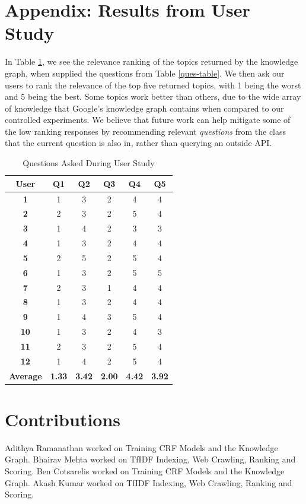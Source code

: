 \documentclass[11pt,a4paper]{article}
\begin{document}



\appendix

\section{Appendix: Results from User Study}

In Table \ref{user-table}, we see the relevance ranking of the topics returned by the knowledge graph, when supplied the questions from Table \ref{ques-table}. We then ask our users to rank the relevance of the top five returned topics, with 1 being the worst and 5 being the best. Some topics work better than others, due to the wide array of knowledge that Google's knowledge graph contains when compared to our controlled experiments. We believe that future work can help mitigate some of the low ranking responses by recommending relevant \textit{questions} from the class that the current question is also in, rather than querying an outside API.

\begin{table}[h!]
\begin{tabular}{|c|c|c|c|c|c|}
    \hline \bf User & \bf Q1 & \bf Q2 & \bf Q3 & \bf Q4 & \bf Q5 \\  
    \hline
    \bf 1 & 1 & 3 & 2 & 4 & 4 \\ 
    \bf 2 & 2 & 3 & 2 & 5 & 4 \\ 
    \bf 3 & 1 & 4 & 2 & 3 & 3 \\ 
    \bf 4 & 1 & 3 & 2 & 4 & 4 \\ 
    \bf 5 & 2 & 5 & 2 & 5 & 4 \\ 
    \bf 6 & 1 & 3 & 2 & 5 & 5 \\ 
    \bf 7 & 2 & 3 & 1 & 4 & 4 \\ 
    \bf 8 & 1 & 3 & 2 & 4 & 4 \\ 
    \bf 9 & 1 & 4 & 3 & 5 & 4 \\ 
    \bf 10 & 1 & 3 & 2 & 4 & 3 \\ 
    \bf 11 & 2 & 3 & 2 & 5 & 4 \\ 
    \bf 12 & 1 & 4 & 2 & 5 & 4 \\ 
    \hline
    \bf Average & \bf 1.33 & \bf 3.42 & \bf 2.00 & \bf 4.42 & \bf 3.92 \\ 
    \hline
\end{tabular}
\caption{\label{user-table} Questions Asked During User Study}
\end{table}

\section{Contributions}
Adithya Ramanathan worked on Training CRF Models and the Knowledge Graph. Bhairav Mehta worked on TfIDF Indexing, Web Crawling, Ranking and Scoring. Ben Cotsarelis worked on Training CRF Models and the Knowledge Graph. Akash Kumar worked on TfIDF Indexing, Web Crawling, Ranking and Scoring.

\end{document}
